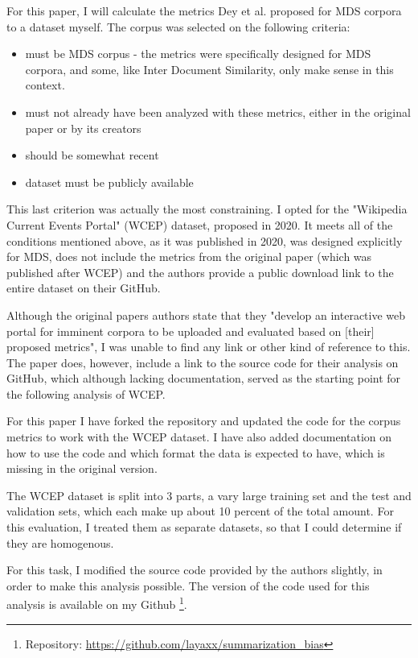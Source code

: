 \documentclass[../main.tex]{subfiles}
\begin{document}
For this paper, I will calculate the metrics Dey et al. proposed for MDS corpora to a dataset myself.
The corpus was selected on the following criteria:

\begin{itemize}
    \item must be MDS corpus - the metrics were specifically designed for MDS corpora, and some, like Inter Document Similarity, only make sense in this context.
    \item must not already have been analyzed with these metrics, either in the original paper or by its creators
    \item should be somewhat recent
    \item dataset must be publicly available
\end{itemize}

This last criterion was actually the most constraining. I opted for the "Wikipedia Current Events Portal" (WCEP) dataset, proposed in 2020. \cite{WCEP-gholipour-ghalandari-etal-2020-large}
It meets all of the conditions mentioned above, as it was published in 2020, was designed explicitly for MDS, does not include the metrics from the original paper (which was published after WCEP) and the authors provide a public download link to the entire dataset on their GitHub.\cite{WCEP-Github-complementizer_2022}


Although the original papers authors state that they "develop an interactive web portal for imminent corpora to be uploaded and evaluated based
on [their] proposed metrics", I was unable to find any link or other kind of reference to this.
The paper does, however, include a link to the source code for their analysis on GitHub, which although lacking documentation, served as the starting point for the following analysis of WCEP.

For this paper I have forked the repository and updated the code for the corpus metrics to work with the WCEP dataset.
I have also added documentation on how to use the code and which format the data is expected to have, which is missing in the original version.


The WCEP dataset is split into 3 parts, a vary large training set and the test and validation sets, which each make up about 10 percent of the total amount.
For this evaluation, I treated them as separate datasets, so that I could determine if they are homogenous.

For this task, I modified the source code provided by the authors slightly, in order to make this analysis possible. The version of the code used for this analysis is available on my Github \footnote{Repository: \url{https://github.com/layaxx/summarization_bias}}.
\end{document}
